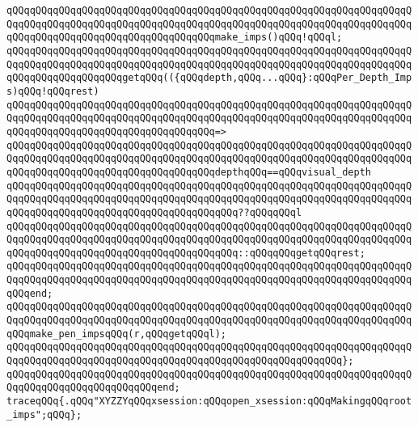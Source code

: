 \verb|qQQqqQQqqQQqqQQqqQQqqQQqqQQqqQQqqQQqqQQqqQQqqQQqqQQqqQQqqQQqqQQqqQQqqQQqqQQqqQQqqQQqqQQqqQQqqQQqqQQqqQQqqQQqqQQqqQQqqQQqqQQqqQQqqQQqqQQqqQQqqQQqqQQqqQQqqQQqqQQqqQQqqQQqqQQqqQQqmake_imps()qQQq!qQQql;|\newline
\newline
\verb|qQQqqQQqqQQqqQQqqQQqqQQqqQQqqQQqqQQqqQQqqQQqqQQqqQQqqQQqqQQqqQQqqQQqqQQqqQQqqQQqqQQqqQQqqQQqqQQqqQQqqQQqqQQqqQQqqQQqqQQqqQQqqQQqqQQqqQQqqQQqqQQqqQQqqQQqqQQqqQQqgetqQQq(({qQQqdepth,qQQq...qQQq}:qQQqPer_Depth_Imps)qQQq!qQQqrest)|\newline
\verb|qQQqqQQqqQQqqQQqqQQqqQQqqQQqqQQqqQQqqQQqqQQqqQQqqQQqqQQqqQQqqQQqqQQqqQQqqQQqqQQqqQQqqQQqqQQqqQQqqQQqqQQqqQQqqQQqqQQqqQQqqQQqqQQqqQQqqQQqqQQqqQQqqQQqqQQqqQQqqQQqqQQqqQQqqQQqqQQq=>|\newline
\verb|qQQqqQQqqQQqqQQqqQQqqQQqqQQqqQQqqQQqqQQqqQQqqQQqqQQqqQQqqQQqqQQqqQQqqQQqqQQqqQQqqQQqqQQqqQQqqQQqqQQqqQQqqQQqqQQqqQQqqQQqqQQqqQQqqQQqqQQqqQQqqQQqqQQqqQQqqQQqqQQqqQQqqQQqqQQqqQQqdepthqQQq==qQQqvisual_depth|\newline
\verb|qQQqqQQqqQQqqQQqqQQqqQQqqQQqqQQqqQQqqQQqqQQqqQQqqQQqqQQqqQQqqQQqqQQqqQQqqQQqqQQqqQQqqQQqqQQqqQQqqQQqqQQqqQQqqQQqqQQqqQQqqQQqqQQqqQQqqQQqqQQqqQQqqQQqqQQqqQQqqQQqqQQqqQQqqQQqqQQqqQQq??qQQqqQQql|\newline
\verb|qQQqqQQqqQQqqQQqqQQqqQQqqQQqqQQqqQQqqQQqqQQqqQQqqQQqqQQqqQQqqQQqqQQqqQQqqQQqqQQqqQQqqQQqqQQqqQQqqQQqqQQqqQQqqQQqqQQqqQQqqQQqqQQqqQQqqQQqqQQqqQQqqQQqqQQqqQQqqQQqqQQqqQQqqQQqqQQqqQQq::qQQqqQQqgetqQQqrest;|\newline
\verb|qQQqqQQqqQQqqQQqqQQqqQQqqQQqqQQqqQQqqQQqqQQqqQQqqQQqqQQqqQQqqQQqqQQqqQQqqQQqqQQqqQQqqQQqqQQqqQQqqQQqqQQqqQQqqQQqqQQqqQQqqQQqqQQqqQQqqQQqqQQqqQQqend;|\newline
\newline
\newline
\verb|qQQqqQQqqQQqqQQqqQQqqQQqqQQqqQQqqQQqqQQqqQQqqQQqqQQqqQQqqQQqqQQqqQQqqQQqqQQqqQQqqQQqqQQqqQQqqQQqqQQqqQQqqQQqqQQqqQQqqQQqqQQqqQQqqQQqqQQqqQQqqQQqmake_pen_impsqQQq(r,qQQqgetqQQql);|\newline
\verb|qQQqqQQqqQQqqQQqqQQqqQQqqQQqqQQqqQQqqQQqqQQqqQQqqQQqqQQqqQQqqQQqqQQqqQQqqQQqqQQqqQQqqQQqqQQqqQQqqQQqqQQqqQQqqQQqqQQqqQQqqQQqqQQq};|\newline
\verb|qQQqqQQqqQQqqQQqqQQqqQQqqQQqqQQqqQQqqQQqqQQqqQQqqQQqqQQqqQQqqQQqqQQqqQQqqQQqqQQqqQQqqQQqqQQqqQQqend;|\newline
\newline
\verb|traceqQQq{.qQQq"XYZZYqQQqxsession:qQQqopen_xsession:qQQqMakingqQQqroot_imps";qQQq};|\newline
